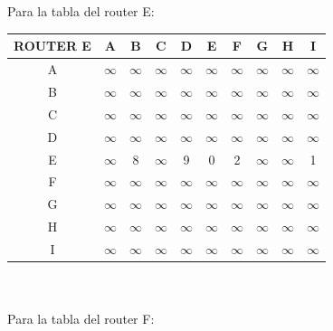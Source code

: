 \documentclass{article}
\begin{document}
\\\\
Para la tabla del router E:\\
\begin{tabular}{ | c | c | c | c | c | c | c | c | c | c |}
\hline                 
ROUTER E    & A      & B      & C      & D      & E      & F      & G      & H      & I      \\
\hline
        A   &$\infty$&$\infty$&$\infty$&$\infty$&$\infty$&$\infty$&$\infty$&$\infty$&$\infty$\\
\hline
        B   &$\infty$&$\infty$&$\infty$&$\infty$&$\infty$&$\infty$&$\infty$&$\infty$&$\infty$\\
\hline
        C   &$\infty$&$\infty$&$\infty$&$\infty$&$\infty$&$\infty$&$\infty$&$\infty$&$\infty$\\
\hline
        D   &$\infty$&$\infty$&$\infty$&$\infty$&$\infty$&$\infty$&$\infty$&$\infty$&$\infty$\\
\hline
        E   &$\infty$& 8      &$\infty$& 9      & 0      & 2      &$\infty$&$\infty$& 1      \\
\hline
        F   &$\infty$&$\infty$&$\infty$&$\infty$&$\infty$&$\infty$&$\infty$&$\infty$&$\infty$\\
\hline
        G   &$\infty$&$\infty$&$\infty$&$\infty$&$\infty$&$\infty$&$\infty$&$\infty$&$\infty$\\
\hline
        H   &$\infty$&$\infty$&$\infty$&$\infty$&$\infty$&$\infty$&$\infty$&$\infty$&$\infty$\\
\hline 
        I   &$\infty$&$\infty$&$\infty$&$\infty$&$\infty$&$\infty$&$\infty$&$\infty$&$\infty$\\
\hline
\end{tabular}
\\\\
Para la tabla del router F:\\
\end{document}
